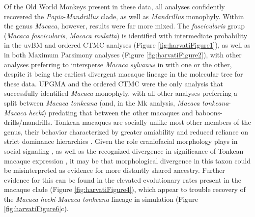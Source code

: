 Of the Old World Monkeys present in these data, all analyses confidently recovered the \textit{Papio}-\textit{Mandrillus} clade, as well as \textit{Mandrillus} monophyly. Within the genus \textit{Macaca}, however, results were far more mixed. The \textit{fascicularis} group (\textit{Macaca fascicularis}, \textit{Macaca mulatta}) is identified with intermediate probability in the uvBM and ordered CTMC analyses (Figure \ref{fig:harvatiFigure1}), as well as in both Maximum Parsimony analyses (Figure \ref{fig:harvatiFigure2}), with other analyses preferring to intersperse \textit{Macaca sylvanus} in with one or the other, despite it being the earliest divergent macaque lineage in the molecular tree for these data. UPGMA and the ordered CTMC were the only analysis that successfully identified \textit{Macaca} monophyly, with all other analyses preferring a split between \textit{Macaca tonkeana} (and, in the Mk analysis, \textit{Macaca tonkeana}-\textit{Macaca hecki}) predating that between the other macaques and baboons-drills/mandrills. Tonkean macaques are socially unlike most other members of the genus, their behavior characterized by greater amiability and reduced reliance on strict dominance hierarchies \citep{thierryPatternsAgonisticInteractions1985, thierryUnityDiversityLessons2007}. Given the role craniofacial morphology plays in social signaling \citep{brechtManyFacetsFacial2012}, as well as the recognized divergence in significance of Tonkean macaque expression \citep{thierryStructuralConvergenceSilent1989, pellisUseBaredteethDisplay2011}, it may be that morphological divergence in this taxon could be misinterpreted as evidence for more distantly shared ancestry. Further evidence for this can be found in the elevated evolutionary rates present in the macaque clade (Figure \ref{fig:harvatiFigure4}), which appear to trouble recovery of the \textit{Macaca hecki}-\textit{Macaca tonkeana} lineage in simulation (Figure \ref{fig:harvatiFigure6}c). 

